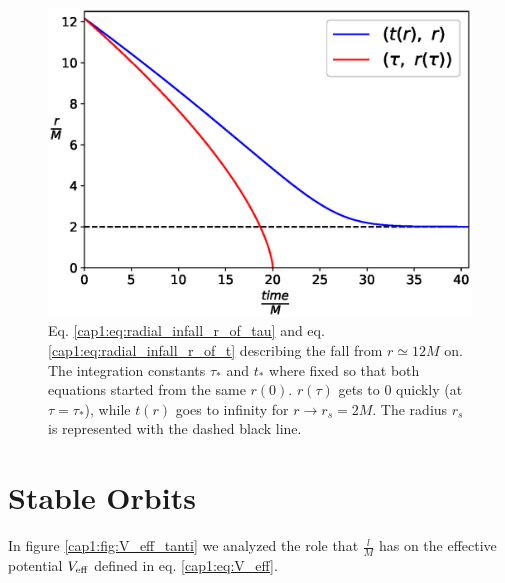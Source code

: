 \begin{figure}[h]
    \centering
    \includegraphics[width = 0.8 \textwidth]{Figures/radial_infall.eps}
    \caption{Eq. \ref{cap1:eq:radial_infall_r_of_tau} and eq.
    \ref{cap1:eq:radial_infall_r_of_t} describing the fall from
    $r \simeq 12M$ on.
    The integration constants $\tau_*$ and $t_*$ where fixed so that both
    equations started from the same $r(0)$.
    $r(\tau)$ gets to 0 quickly (at $\tau = \tau_*$), while $t(r)$ goes to
    infinity for $r \rightarrow r_s = 2M$. The \Sh radius $r_s$ is represented
    with the dashed black line.}
    \label{cap1:fig:radial_infall}

\end{figure}


\newpage
\section{Stable Orbits}

In figure \ref{cap1:fig:V_eff_tanti} we analyzed the role that $\frac{l}{M}$ has
on the effective potential $V_{\rm eff}$ defined in eq. \ref{cap1:eq:V_eff}.

